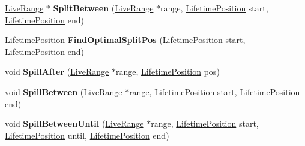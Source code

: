 \begin{DoxyCompactItemize}
\item 
\hyperlink{classv8_1_1internal_1_1_live_range}{Live\+Range} $\ast$ {\bfseries Split\+Between} (\hyperlink{classv8_1_1internal_1_1_live_range}{Live\+Range} $\ast$range, \hyperlink{classv8_1_1internal_1_1_lifetime_position}{Lifetime\+Position} start, \hyperlink{classv8_1_1internal_1_1_lifetime_position}{Lifetime\+Position} end)\hypertarget{classv8_1_1internal_1_1_b_a_s_e___e_m_b_e_d_d_e_d_ab07218e9d2572e1acbb5da16cc3ba97e}{}\label{classv8_1_1internal_1_1_b_a_s_e___e_m_b_e_d_d_e_d_ab07218e9d2572e1acbb5da16cc3ba97e}

\item 
\hyperlink{classv8_1_1internal_1_1_lifetime_position}{Lifetime\+Position} {\bfseries Find\+Optimal\+Split\+Pos} (\hyperlink{classv8_1_1internal_1_1_lifetime_position}{Lifetime\+Position} start, \hyperlink{classv8_1_1internal_1_1_lifetime_position}{Lifetime\+Position} end)\hypertarget{classv8_1_1internal_1_1_b_a_s_e___e_m_b_e_d_d_e_d_ae80bf6d9039b1a0c8fceec7e1d50e421}{}\label{classv8_1_1internal_1_1_b_a_s_e___e_m_b_e_d_d_e_d_ae80bf6d9039b1a0c8fceec7e1d50e421}

\item 
void {\bfseries Spill\+After} (\hyperlink{classv8_1_1internal_1_1_live_range}{Live\+Range} $\ast$range, \hyperlink{classv8_1_1internal_1_1_lifetime_position}{Lifetime\+Position} pos)\hypertarget{classv8_1_1internal_1_1_b_a_s_e___e_m_b_e_d_d_e_d_a364febf21f54c3261d3404397b70708f}{}\label{classv8_1_1internal_1_1_b_a_s_e___e_m_b_e_d_d_e_d_a364febf21f54c3261d3404397b70708f}

\item 
void {\bfseries Spill\+Between} (\hyperlink{classv8_1_1internal_1_1_live_range}{Live\+Range} $\ast$range, \hyperlink{classv8_1_1internal_1_1_lifetime_position}{Lifetime\+Position} start, \hyperlink{classv8_1_1internal_1_1_lifetime_position}{Lifetime\+Position} end)\hypertarget{classv8_1_1internal_1_1_b_a_s_e___e_m_b_e_d_d_e_d_ad61363c73532210d7492de97152e7c4e}{}\label{classv8_1_1internal_1_1_b_a_s_e___e_m_b_e_d_d_e_d_ad61363c73532210d7492de97152e7c4e}

\item 
void {\bfseries Spill\+Between\+Until} (\hyperlink{classv8_1_1internal_1_1_live_range}{Live\+Range} $\ast$range, \hyperlink{classv8_1_1internal_1_1_lifetime_position}{Lifetime\+Position} start, \hyperlink{classv8_1_1internal_1_1_lifetime_position}{Lifetime\+Position} until, \hyperlink{classv8_1_1internal_1_1_lifetime_position}{Lifetime\+Position} end)\hypertarget{classv8_1_1internal_1_1_b_a_s_e___e_m_b_e_d_d_e_d_a5c7e1703aeeee908362dc120c52658ae}{}\label{classv8_1_1internal_1_1_b_a_s_e___e_m_b_e_d_d_e_d_a5c7e1703aeeee908362dc120c52658ae}


\end{DoxyCompactItemize}
